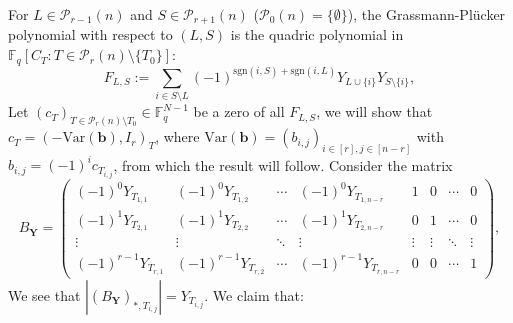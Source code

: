 \documentclass[a4paper, 11pt]{amsart}
\newcommand{\mc}[1]{\mathcal{#1}}
\newcommand{\ssm}[1]{\sum_{#1}}
\newcommand{\td}[1]{\bm{#1}}
\newcommand{\tx}[1]{\text{#1}}
\newcommand{\fq}{\mathbb{F}_q}
\theoremstyle{definition}
\theoremstyle{definition}
\begin{document}
	For $L\in\mc{P}_{r-1}(n)$ and $S\in\mc{P}_{r+1}(n)$ ($\mc{P}_0(n)=\{\emptyset\}$), the Grassmann-Plücker polynomial with respect to $(L,S)$ is the quadric polynomial in $\fq[C_T:T\in\mc{P}_r(n)\setminus\{T_0\}]$:
	\begin{equation}\label{eq:GS}
		F_{L,S}:=\ssm{i\in S\setminus L}(-1)^{\tx{sgn}(i,S)+\tx{sgn}(i,L)}Y_{L\cup\{i\}}Y_{S\setminus\{i\}},
	\end{equation}
	Let $(c_T)_{T\in\mc{P}_r(n)\setminus T_0}\in\fq^{N-1}$ be a zero of all $F_{L,S}$, we will show that $c_T=(-\tx{Var}(\td{b}),I_r)_T$, where $\tx{Var}(\td{b})=(b_{i,j})_{i\in[r],j\in[n-r]}$ with $b_{i,j}=(-1)^ic_{T_{i,j}}$, from which the result will follow. Consider the matrix
	\begin{equation*}
		B_{\td{Y}}=\begin{pmatrix}
			(-1)^{0}Y_{T_{1,1}}&(-1)^{0}Y_{T_{1,2}}&\cdots&(-1)^{0}Y_{T_{1,n-r}}&1&0&\cdots&0\\
			(-1)^{1}Y_{T_{2,1}}&(-1)^{1}Y_{T_{2,2}}&\cdots&(-1)^{1}Y_{T_{2,n-r}}&0&1&\cdots&0\\
			\vdots&\vdots&\ddots&\vdots&\vdots&\vdots&\ddots&\vdots\\
			(-1)^{r-1}Y_{T_{r,1}}&(-1)^{r-1}Y_{T_{r,2}}&\cdots&(-1)^{r-1}Y_{T_{r,n-r}}&0&0&\cdots&1
		\end{pmatrix},
	\end{equation*}
	We see that $|(B_{\td{Y}})_{*,T_{i,j}}|=Y_{T_{i,j}}$. We claim that:
	
\end{document}
